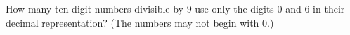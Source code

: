 How many ten-digit numbers divisible by $9$ use only the digits $0$ and $6$ in their decimal representation? (The numbers may not begin with $0$.)
